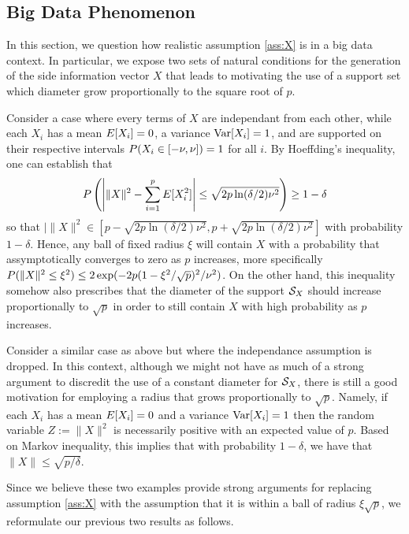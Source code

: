 \subsection{Big Data Phenomenon}\label{sec:bigdata}

In this section, we question how realistic assumption \ref{ass:X} is in a big data
context. In particular, we expose two sets of natural conditions for the generation of the
side information vector $X$ that leads to motivating the use of a support set which
diameter grow proportionally to the square root of $p$.

\begin{ex}
  Consider a case where every terms of $X$ are independant from each other, while each
  $X_i$ has a mean $E[X_i]=0$, a variance $\operatorname{Var}[X_i]=1$, and are supported on their
  respective intervals $P(X_i\in [-\nu, \nu])=1$ for all $i$. By Hoeffding's
  inequality, one can establish that
  \[
    P\left(\left|\|X\|^2 - \sum_{i=1}^p E[X_i^2]\right| \leq
      \sqrt{2p\ln(\delta/2)\nu^2}\right) \geq 1-\delta
  \]
  so that $|\|X\|^2 \in [p- \sqrt{2p\ln(\delta/2)\nu^2}, p+ \sqrt{2p\ln(\delta/2)\nu^2}]$
  with probability $1-\delta$. Hence, any ball of fixed radius $\xi$ will contain $X$ with
  a probability that assymptotically converges to zero as $p$ increases, more specifically
  $P(\|X\|^2\leq \xi^2)\leq 2\exp(-2p(1-\xi^2/\sqrt{p})^2/\nu^2)$. On the other hand,
  this inequality somehow also prescribes that the diameter of the support ${\mathcal{S}_X}$ should
  increase proportionally to $\sqrt{p}$ in order to still contain $X$ with high
  probability as $p$ increases.
\end{ex}

\begin{ex}
  Consider a similar case as above but where the independance assumption is dropped. In
  this context, although we might not have as much of a strong argument to discredit the
  use of a constant diameter for ${\mathcal{S}_X}$, there is still a good motivation for employing a
  radius that grows proportionally to $\sqrt{p}$. Namely, if each $X_i$ has a mean
  $E[X_i]=0$ and a variance $\operatorname{Var}[X_i]=1$ then the random variable $Z:=\|X\|^2$ is
  necessarily positive with an expected value of $p$. Based on Markov inequality, this
  implies that with probability $1-\delta$, we have that $\|X\|\leq \sqrt{p/\delta}$.
\end{ex}

Since we believe these two examples provide strong arguments for replacing assumption
\ref{ass:X} with the assumption that it is within a ball of radius $\xi\sqrt{p}$, we
reformulate our previous two results as follows.

